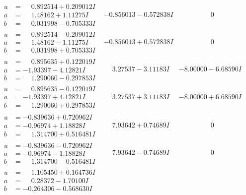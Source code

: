 \documentclass[1p]{elsarticle_modified}
\theoremstyle{definition}
\begin{document}
$$\begin{array}{c|c|c}
\begin{aligned}
u &= \phantom{-}0.892514 + 0.209012 I \\
a &= \phantom{-}1.48162 + 1.11275 I \\
b &= \phantom{-}0.031998 - 0.705333 I\end{aligned}
 & -0.856013 - 0.572838 I & \phantom{-0.000000 } 0 \\ \hline\begin{aligned}
u &= \phantom{-}0.892514 - 0.209012 I \\
a &= \phantom{-}1.48162 - 1.11275 I \\
b &= \phantom{-}0.031998 + 0.705333 I\end{aligned}
 & -0.856013 + 0.572838 I & \phantom{-0.000000 } 0 \\ \hline\begin{aligned}
u &= \phantom{-}0.895635 + 0.122019 I \\
a &= -1.93397 - 4.12821 I \\
b &= \phantom{-}1.290060 - 0.297853 I\end{aligned}
 & \phantom{-}3.27537 - 3.11183 I & -8.00000 - 6.68590 I \\ \hline\begin{aligned}
u &= \phantom{-}0.895635 - 0.122019 I \\
a &= -1.93397 + 4.12821 I \\
b &= \phantom{-}1.290060 + 0.297853 I\end{aligned}
 & \phantom{-}3.27537 + 3.11183 I & -8.00000 + 6.68590 I \\ \hline\begin{aligned}
u &= -0.839636 + 0.720962 I \\
a &= -0.96974 + 1.18828 I \\
b &= \phantom{-}1.314700 + 0.516481 I\end{aligned}
 & \phantom{-}7.93642 + 0.74689 I & \phantom{-0.000000 } 0 \\ \hline\begin{aligned}
u &= -0.839636 - 0.720962 I \\
a &= -0.96974 - 1.18828 I \\
b &= \phantom{-}1.314700 - 0.516481 I\end{aligned}
 & \phantom{-}7.93642 - 0.74689 I & \phantom{-0.000000 } 0 \\ \hline\begin{aligned}
u &= \phantom{-}1.105450 + 0.164736 I \\
a &= \phantom{-}0.28372 - 1.70100 I \\
b &= -0.264306 - 0.568630 I\end{aligned}

\end{array}$$
\end{document}
